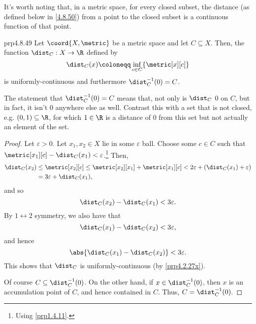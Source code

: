 It's worth noting that, in a metric space, for every closed subset, the distance (as defined below in \eqref{4.8.50}) from a point to the closed subset is a continuous function of that point.
\begin{prp}{}{prp4.8.49}
Let $\coord{X,\metric}$ be a metric space and let $C\subseteq X$.  Then, the function $\dist _C:X\rightarrow \R$ defined by
\begin{equation}\label{4.8.50}
\dist _C(x)\coloneqq \inf _{c\in C}\{ \metric[x][c]\} 
\end{equation}
is uniformly-continuous and furthermore $\dist _C^{-1}(0)=C$.
\begin{rmk}
The statement that $\dist _C^{-1}(0)=C$ means that, not only is $\dist _C$ $0$ on $C$, but in fact, it isn't $0$ anywhere else as well.  Contrast this with a set that is not closed, e.g. $(0,1)\subseteq \R$, for which $1\in \R$ is a distance of $0$ from this set but not actually an element of the set.
\end{rmk}
\begin{proof}
Let $\varepsilon >0$.  Let $x_1,x_2\in X$ lie in some $\varepsilon$ ball.  Choose some $c\in C$ such that $\metric[x_1][c]-\dist_C(x_1)<\varepsilon$.\footnote{Using \cref{prp1.4.11}.}  Then,
\begin{equation}
\begin{split}
\dist _C(x_2) & \leq \metric[x_2][c]\leq \metric[x_2][x_1]+\metric[x_1][c]<2\varepsilon +(\dist _C(x_1)+\varepsilon ) \\
& =3\varepsilon +\dist _C(x_1),
\end{split}
\end{equation}
and so
\begin{equation}
\dist _C(x_2)-\dist _C(x_1)<3\varepsilon .
\end{equation}
By $1\leftrightarrow 2$ symmetry, we also have that
\begin{equation}
\dist _C(x_1)-\dist _C(x_2)<3\varepsilon ,
\end{equation}
and hence
\begin{equation}
\abs{\dist _C(x_1)-\dist _C(x_2)}<3\varepsilon .
\end{equation}
This shows that $\dist _C$ is uniformly-continuous (by \cref{prp4.2.27x}).

Of course $C\subseteq \dist _C^{-1}(0)$.  On the other hand, if $x\in \dist _C^{-1}(0)$, then $x$ is an accumulation point of $C$, and hence contained in $C$.  Thus, $C=\dist _C^{-1}(0)$.
\end{proof}
\end{prp}

